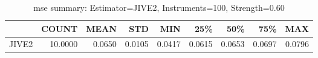 \begin{table}[ht]
\centering
\caption{mse summary: Estimator=JIVE2, Instruments=100, Strength=0.60}
\begin{tabular}{lrrrrrrrr}
\toprule
 & COUNT & MEAN & STD & MIN & 25\% & 50\% & 75\% & MAX \\
\midrule
JIVE2 & 10.0000 & 0.0650 & 0.0105 & 0.0417 & 0.0615 & 0.0653 & 0.0697 & 0.0796 \\
\bottomrule
\end{tabular}
\end{table}
